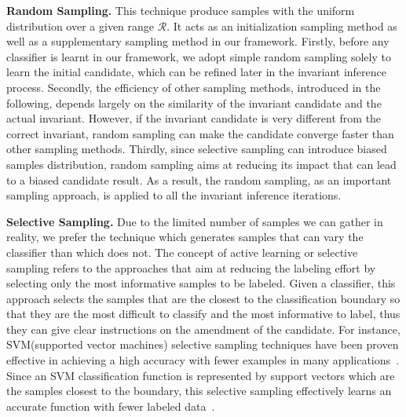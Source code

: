 \medskip\noindent
\textbf{Random Sampling.}
This technique produce samples with the uniform distribution over a given range $\mathcal{R}$.
It acts as an initialization sampling method 
as well as a supplementary sampling method in our framework. 
Firstly, before any classifier is learnt in our framework, 
we adopt simple random sampling solely to learn the initial candidate, 
which can be refined later in the invariant inference process. 
Secondly, the efficiency of other sampling methods, introduced in the following, 
depends largely on the similarity of the invariant candidate and the actual invariant. 
However, if the invariant candidate is very different from the correct invariant, 
random sampling can make the candidate converge faster than other sampling methods. 
Thirdly, since selective sampling can introduce biased samples distribution, 
random sampling aims at reducing its impact that can lead to a biased candidate result. 
As a result, the random sampling, as an important sampling approach, 
is applied to all the invariant inference iterations. 

\medskip\noindent
\textbf{Selective Sampling.}
Due to the limited number of samples we can gather in reality, 
we prefer the technique which generates samples that can vary the classifier than which does not.
The concept of active learning or selective sampling refers to the approaches 
that aim at reducing the labeling effort by selecting only the most informative samples to be labeled.
Given a classifier, this approach selects the samples that are the closest to the classification boundary 
so that they are the most difficult to classify and the most informative to label,
thus they can give clear instructions on the amendment of the candidate.
For instance, SVM(supported vector machines) selective sampling techniques have been proven effective in achieving a high accuracy 
with fewer examples in many applications~\cite{DBLP:conf/mm/TongC01,DBLP:journals/jmlr/TongK01}. 
Since an SVM classification function is represented by support vectors which are the samples closest to the boundary, 
this selective sampling effectively learns an accurate function with fewer labeled data~\cite{DBLP:conf/icml/SchohnC00}.

